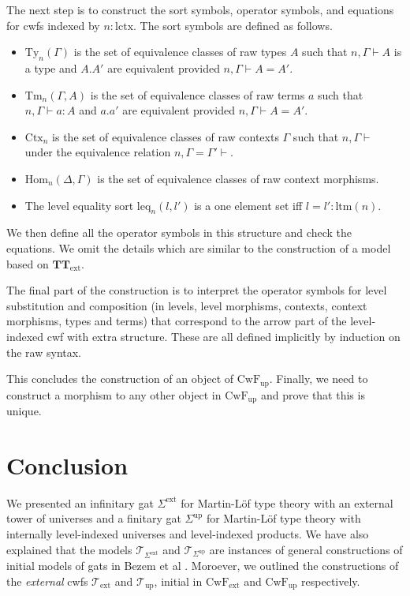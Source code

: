 \documentclass[11pt,a4paper]{article}
\theoremstyle{plain}
\theoremstyle{definition}
\newcommand{\Ctx}{\mathrm{Ctx}}
\newcommand{\Sub}{\mathrm{Hom}}
\newcommand{\Ty}{\mathrm{Ty}}
\newcommand{\Tm}{\mathrm{Tm}}
\newcommand{\T}{\mathsf{T}}
\def\lctx{\mathrm{lctx}}
\def\ltm{\mathrm{ltm}}
\def\leq{\mathrm{leq}}
\def\T{\mathcal{T}}
\def\CwFext{\mathrm{CwF_{ext}}}
\def\CwFint{\mathrm{CwF_{up}}}
\def\Sigmaext{{\Sigma^\mathrm{ext}}}
\def\Sigmaint{{\Sigma^\mathrm{up}}}
\def\TText{{\mathbf{TT}_\mathrm{ext}}}
\def\Text{\T_\mathrm{ext}}
\def\Tint{\T_\mathrm{up}}
\begin{document}
The next step is to construct the sort symbols, operator symbols, and equations for cwfs indexed by $n : \lctx$. The sort symbols are defined as follows.
\begin{itemize}
\item $\Ty_n(\Gamma)$ is the set of equivalence classes of raw types $A$ such that $n, \Gamma \vdash A$ is a type and $A.A'$ are equivalent provided $n, \Gamma \vdash A = A'$.
\item $\Tm_n(\Gamma,A)$ is the set of equivalence classes of raw terms $a$ such that $n, \Gamma \vdash a : A$ and $a.a'$ are equivalent provided $n, \Gamma \vdash A = A'$.
\item $\Ctx_n$ is the set of equivalence classes of raw contexts $\Gamma$ such that $n, \Gamma \vdash$ under the equivalence relation $n, \Gamma = \Gamma' \vdash$.
\item $\Sub_n(\Delta,\Gamma)$ is the set of equivalence classes of raw context morphisms.
\item The level equality sort $\leq_n(l,l')$ is a one element set iff $l = l' : \ltm(n)$.
\end{itemize}
We then define all the operator symbols in this structure and check the equations. We omit the details which are similar to the construction of a model based on $\TText$.

The final part of the construction is to interpret the operator symbols for level substitution and composition (in levels, level morphisms, contexts, context morphisms, types and terms) that correspond to the arrow part of the level-indexed cwf with extra structure. These are all defined implicitly by induction on the raw syntax.

This concludes the construction of an object of $\CwFint$. Finally, we need to construct a morphism to any other object in $\CwFint$ and prove that this is unique.


\section{Conclusion}

We presented an infinitary gat $\Sigmaext$ for Martin-Löf type theory with an external tower of universes and a finitary gat $\Sigmaint$ for Martin-Löf type theory with internally level-indexed universes and level-indexed products. We have also explained that the models $\T_{\Sigmaext}$ and $\T_{\Sigmaint}$ are instances of general constructions of initial models of gats in
Bezem et al \cite{bezem:hofmann}. Moroever, we outlined the constructions of the {\em external} cwfs $\Text$ and $\Tint$, initial in $\CwFext$ and $\CwFint$ respectively.
\end{document}
